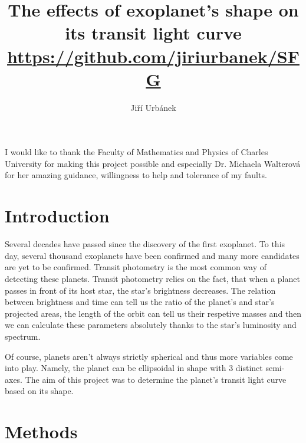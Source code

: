 \documentclass[10pt]{article}
\title{The effects of exoplanet's shape on its transit light curve \\
\small{\url{https://github.com/jiriurbanek/SFG}}}
\author{Jiří Urbánek}
\numberwithin{equation}{subsection}
\begin{document}
\maketitle
I would like to thank the Faculty of Mathematics and Physics of Charles University for
making this project possible and especially Dr. Michaela Walterová for her amazing
guidance, willingness to help and tolerance of my faults.
\section{Introduction}
Several decades have passed since the discovery of the first exoplanet. To this day,
several thousand exoplanets have been confirmed and many more candidates are yet to
be confirmed. Transit photometry is the most common way of detecting these planets.
Transit photometry relies on the fact, that when a planet passes in front of its host
star, the star's brightness decreases. The relation between brightness and time can tell
us the ratio of the planet's and star's projected areas, the length of the orbit can tell
us their respetive masses and then we can calculate these parameters absolutely thanks to
the star's luminosity and spectrum.

Of course, planets aren't always strictly spherical and thus more variables come into play.
Namely, the planet can be ellipsoidal in shape with 3 distinct semi-axes. The aim of this
project was to determine the planet's transit light curve based on its shape.
\section{Methods}
\end{document}
